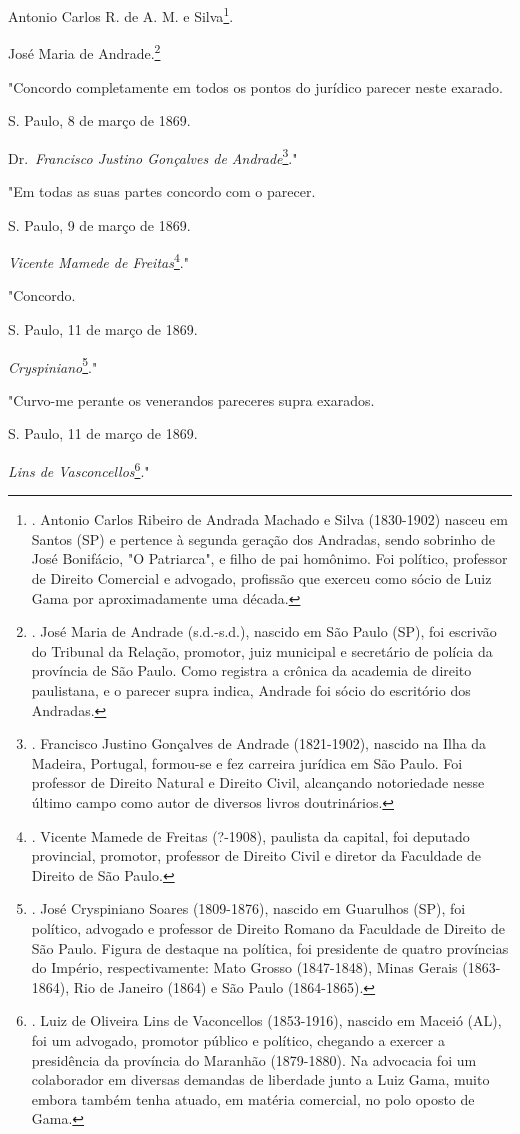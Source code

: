 Antonio Carlos R. de A. M. e Silva\footnote{. Antonio Carlos Ribeiro de
  Andrada Machado e Silva (1830-1902) nasceu em Santos (SP) e pertence à
  segunda geração dos Andradas, sendo sobrinho de José Bonifácio, "O
  Patriarca", e filho de pai homônimo. Foi político, professor de
  Direito Comercial e advogado, profissão que exerceu como sócio de Luiz
  Gama por aproximadamente uma década.}.

José Maria de Andrade.\footnote{. José Maria de Andrade (s.d.-s.d.),
  nascido em São Paulo (SP), foi escrivão do Tribunal da Relação,
  promotor, juiz municipal e secretário de polícia da província de São
  Paulo. Como registra a crônica da academia de direito paulistana, e o
  parecer supra indica, Andrade foi sócio do escritório dos Andradas.}

"Concordo completamente em todos os pontos do jurídico parecer neste
exarado.

S. Paulo, 8 de março de 1869.

Dr.~\emph{Francisco Justino Gonçalves de Andrade}\footnote{. Francisco
  Justino Gonçalves de Andrade (1821-1902), nascido na Ilha da Madeira,
  Portugal, formou-se e fez carreira jurídica em São Paulo. Foi
  professor de Direito Natural e Direito Civil, alcançando notoriedade
  nesse último campo como autor de diversos livros doutrinários.}."

"Em todas as suas partes concordo com o parecer.

S. Paulo, 9 de março de 1869.

\emph{Vicente Mamede de Freitas}\footnote{. Vicente Mamede de Freitas
  (?-1908), paulista da capital, foi deputado provincial, promotor,
  professor de Direito Civil e diretor da Faculdade de Direito de São
  Paulo.}."

"Concordo.

S. Paulo, 11 de março de 1869.

\emph{Cryspiniano}\footnote{. José Cryspiniano Soares (1809-1876),
  nascido em Guarulhos (SP), foi político, advogado e professor de
  Direito Romano da Faculdade de Direito de São Paulo. Figura de
  destaque na política, foi presidente de quatro províncias do Império,
  respectivamente: Mato Grosso (1847-1848), Minas Gerais (1863-1864),
  Rio de Janeiro (1864) e São Paulo (1864-1865).}."

"Curvo-me perante os venerandos pareceres supra exarados.

S. Paulo, 11 de março de 1869.

\emph{Lins de Vasconcellos}\footnote{. Luiz de Oliveira Lins de
  Vaconcellos (1853-1916), nascido em Maceió (AL), foi um advogado,
  promotor público e político, chegando a exercer a presidência da
  província do Maranhão (1879-1880). Na advocacia foi um colaborador em
  diversas demandas de liberdade junto a Luiz Gama, muito embora também
  tenha atuado, em matéria comercial, no polo oposto de Gama.}."

